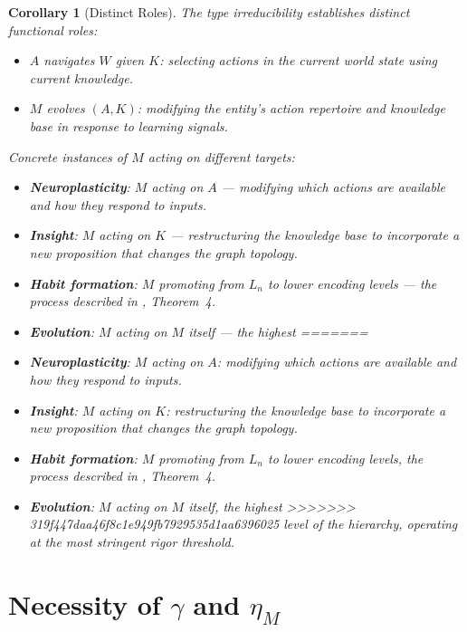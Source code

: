 \documentclass[11pt]{article}
\newtheorem{corollary}[theorem]{Corollary}
\theoremstyle{definition}
\theoremstyle{remark}
\begin{document}
\begin{corollary}[Distinct Roles]
\label{cor:roles}
The type irreducibility establishes distinct functional roles:
\begin{itemize}
\item $A$ navigates $W$ given $K$: selecting actions in the current
      world state using current knowledge.
\item $M$ evolves $(A, K)$: modifying the entity's action repertoire
      and knowledge base in response to learning signals.
\end{itemize}
Concrete instances of $M$ acting on different targets:
\begin{itemize}
<<<<<<< HEAD
\item \textbf{Neuroplasticity}: $M$ acting on $A$ --- modifying which
      actions are available and how they respond to inputs.
\item \textbf{Insight}: $M$ acting on $K$ --- restructuring the
      knowledge base to incorporate a new proposition that changes the
      graph topology.
\item \textbf{Habit formation}: $M$ promoting from $L_n$ to lower
      encoding levels --- the process described in
      \cite{McCarthy2026d}, Theorem~4.
\item \textbf{Evolution}: $M$ acting on $M$ itself --- the highest
=======
\item \textbf{Neuroplasticity}: $M$ acting on $A$: modifying which
      actions are available and how they respond to inputs.
\item \textbf{Insight}: $M$ acting on $K$: restructuring the
      knowledge base to incorporate a new proposition that changes the
      graph topology.
\item \textbf{Habit formation}: $M$ promoting from $L_n$ to lower
      encoding levels, the process described in
      \cite{McCarthy2026d}, Theorem~4.
\item \textbf{Evolution}: $M$ acting on $M$ itself, the highest
>>>>>>> 319f447daa46f8c1e949fb7929535d1aa6396025
      level of the hierarchy, operating at the most stringent rigor
      threshold.
\end{itemize}
\end{corollary}

\section{Necessity of $\gamma$ and $\eta_M$}
\label{sec:necessity}
\end{document}
